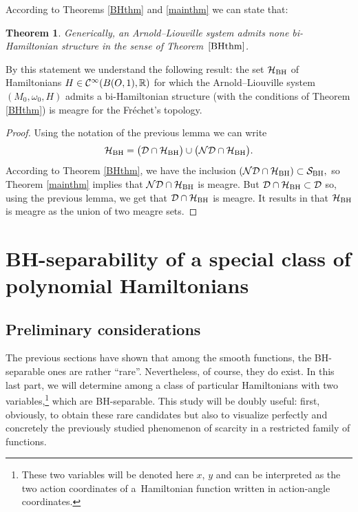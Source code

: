 \documentclass[10pt,a4paper]{amsart}
\numberwithin{equation}{section}
\newtheorem{Theorem}{Theorem}[section]
\begin{document}
According to Theorems \ref{BHthm} and \ref{mainthm} we can state that:

\begin{Theorem}\label{mainthmAL}
	Generically, an Arnold--Liouville system admits none bi-Hamiltonian structure in the sense of Theorem~$\ref{BHthm}$.
\end{Theorem}

By this statement we understand the following result: the set ${\cal H}_{\rm BH}$ of Hamiltonians $H\in{\cal C}^{\infty}(B(O,1),\mathbb{R})$ for which the Arnold--Liouville system $(M_0,\omega_0,H)$ admits a bi-Hamiltonian structure (with the conditions of Theorem \ref{BHthm}) is meagre for the Fr\'echet's topology.



\begin{proof}
	Using the notation of the previous lemma we can write
\begin{gather*}
{\cal H}_{\rm BH}=\big({\cal D}\cap{\cal H}_{\rm BH}\big)\cup\big({\cal ND}\cap{\cal H}_{\rm BH}\big).
\end{gather*}
	According to Theorem \ref{BHthm}, we have the inclusion
	$\left({\cal ND}\cap{\cal H}_{\rm BH}\right)\subset{\cal S}_{\rm BH},$
	so Theorem \ref{mainthm} implies that ${\cal ND}\cap{\cal H}_{\rm BH}$ is meagre.
	But ${\cal D}\cap{\cal H}_{\rm BH}\subset{\cal D}$ so, using the previous lemma, we get that ${\cal D}\cap{\cal H}_{\rm BH}$ is meagre. It results in that ${\cal H}_{\rm BH}$ is meagre as the union of two meagre sets.
\end{proof}


\section{BH-separability of a special class of polynomial Hamiltonians}

\subsection{Preliminary considerations}

The previous sections have shown that among the smooth functions, the BH-separable ones are rather ``rare''. Nevertheless, of course, they do exist. In this last part, we will determine among a class of particular Hamiltonians with two variables,\footnote{These two variables will be denoted here $x$, $y$ and can be interpreted as the two action coordinates of a~Hamiltonian function written in action-angle coordinates.} which are BH-separable. This study will be doubly useful: first, obviously, to obtain these rare candidates but also to visualize perfectly and concretely the previously studied phenomenon of scarcity in a restricted family of functions.
\end{document}
